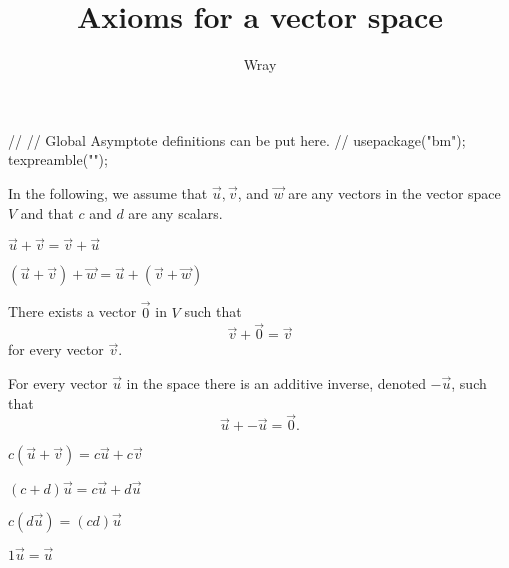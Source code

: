 \documentclass[addpoints, 12pt]{exam}
\title{Axioms for a vector space}
\author{Wray}
\begin{document}
\begin{asydef}
//
// Global Asymptote definitions can be put here.
//
usepackage("bm");
texpreamble("\def\V#1{\bm{#1}}");
\end{asydef}



\bigskip
\bigskip

In the following, we assume that $\vec{u}, \vec{v}$, and $\vec{w}$ are any vectors in the vector space $V$ and that $c$ and $d$ are any scalars.   
\begin{questions}

\question
$\vec{u} + \vec{v} = \vec{v} + \vec{u}$

\question
$(\vec{u} + \vec{v}) + \vec{w} = \vec{u} + (\vec{v} + \vec{w})$

\question
There exists a vector $\vec{0}$ in $V$ such that
\begin{equation*}
	\vec{v} + \vec{0} = \vec{v}
\end{equation*}
for every vector $\vec{v}$.

\question
For every vector $\vec{u}$ in the space there is an additive inverse, denoted $-\vec{u}$, such that
\begin{equation*}
	\vec{u} + -\vec{u} = \vec{0}.
\end{equation*}

\question
$c(\vec{u} + \vec{v}) = c \vec{u} + c \vec{v}$

\question
$(c + d) \vec{u} = c \vec{u} + d \vec{u}$

\question
$c (d \vec{u}) = (cd) \vec{u}$

\question
$1 \vec{u} = \vec{u}$

\end{questions}
\end{document}
